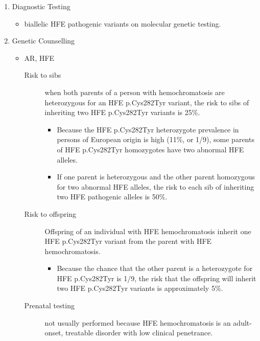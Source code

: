 \documentclass[12pt]{scrartcl}
\begin{document}
\begin{enumerate}
\item Diagnostic Testing
\label{sec:org168e82a}
\begin{itemize}
\item biallelic HFE pathogenic variants on molecular genetic testing.
\end{itemize}
\item Genetic Counselling
\label{sec:org3e3fbae}
\begin{itemize}
\item AR, HFE
\begin{description}
\item[{Risk to sibs}] when both parents of a person with hemochromatosis
are heterozygous for an HFE p.Cys282Tyr variant,
the risk to sibs of inheriting two HFE p.Cys282Tyr
variants is 25\%.
\begin{itemize}
\item Because the HFE p.Cys282Tyr heterozygote prevalence in persons
of European origin is high (11\%, or 1/9), some parents of HFE
p.Cys282Tyr homozygotes have two abnormal HFE alleles.
\item If one parent is heterozygous and the other parent homozygous
for two abnormal HFE alleles, the risk to each sib of inheriting
two HFE pathogenic alleles is 50\%.
\end{itemize}
\item[{Risk to offspring}] Offspring of an individual with HFE
hemochromatosis inherit one HFE p.Cys282Tyr variant from the
parent with HFE hemochromatosis.
\begin{itemize}
\item Because the chance that the other parent is a heterozygote for
HFE p.Cys282Tyr is 1/9, the risk that the offspring will inherit
two HFE p.Cys282Tyr variants is approximately 5\%.
\end{itemize}
\item[{Prenatal testing}] not usually performed because HFE
hemochromatosis is an adult-onset, treatable disorder with low
clinical penetrance.
\end{description}
\end{itemize}
\end{enumerate}
\end{document}
